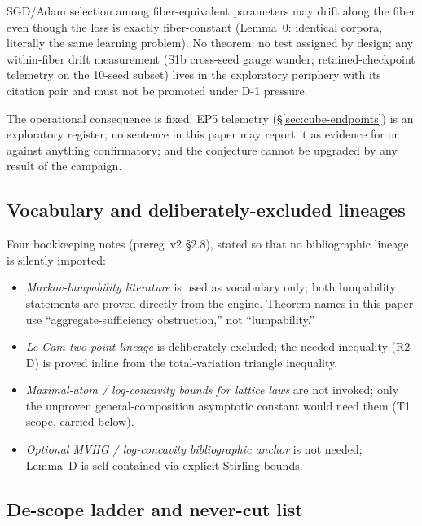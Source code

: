\begin{conjecture}
SGD/Adam selection among fiber-equivalent parameters may drift along the fiber
even though the loss is exactly fiber-constant (Lemma~0: identical corpora,
literally the same learning problem). No theorem; no test assigned by design;
any within-fiber drift measurement (S1b cross-seed gauge wander;
retained-checkpoint telemetry on the 10-seed subset) lives in the exploratory
periphery with its citation pair \citep{soudry2017,lossbasis2026} and must not
be promoted under D-1 pressure.
\end{conjecture}

The operational consequence is fixed: EP5 telemetry
(\S\ref{sec:cube-endpoints}) is an exploratory register; no sentence in this
paper may report it as evidence for or against anything confirmatory; and the
 conjecture cannot be upgraded by any result of the campaign.

\subsection{Vocabulary and deliberately-excluded lineages}
\label{sec:scope-vocab}

Four bookkeeping notes (prereg~v2 \S2.8), stated so that no bibliographic
lineage is silently imported:

\begin{itemize}
\item \emph{Markov-lumpability literature} is used as vocabulary only; both
  lumpability statements are proved directly from the engine. Theorem names
  in this paper use ``aggregate-sufficiency obstruction,'' not
  ``lumpability.''
\item \emph{Le Cam two-point lineage} is deliberately excluded; the needed
  inequality (R2-D) is proved inline from the total-variation triangle
  inequality.
\item \emph{Maximal-atom / log-concavity bounds for lattice laws} are not
  invoked; only the unproven general-composition asymptotic constant would
  need them (T1 scope, carried below).
\item \emph{Optional MVHG / log-concavity bibliographic anchor} is not
  needed; Lemma~D is self-contained via explicit Stirling bounds.
\end{itemize}

\subsection{De-scope ladder and never-cut list}
\label{sec:scope-ladder}


